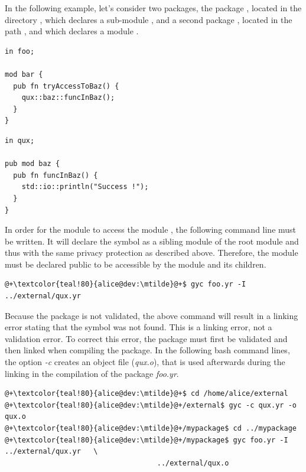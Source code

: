In the following example, let's consider two packages, the package ,
located in the directory , which declares a
sub-module , and a second package , located in the path
, and which declares a module .

\begin{lstlisting}[caption=\textit{/home/alice/mypackage/foo.yr}, style=coloredverbatim]
in foo;

mod bar {
  pub fn tryAccessToBaz() {
    qux::baz::funcInBaz();
  }
}
\end{lstlisting}

\begin{lstlisting}[caption=\textit{/home/alice/external/qux.yr}, style=coloredverbatim]
in qux;

pub mod baz {
  pub fn funcInBaz() {
    std::io::println("Success !");
  }
}
\end{lstlisting}

In order for the module  to access the module
, the following command line must be written. It will declare
the symbol  as a sibling module of the root module  and
thus with the same privacy protection as described above. Therefore, the module
 must be declared public to be accessible by the module
 and its children.

\begin{lstlisting}[style=bashVerb, escapechar=@+]
@+\textcolor{teal!80}{alice@dev:\mtilde}@+$ gyc foo.yr -I ../external/qux.yr
\end{lstlisting}

Because the  package is not validated, the above command will result
in a linking error stating that the symbol  was not
found. This is a linking error, not a validation error. To correct this error,
the  package must first be validated and then linked when compiling
the  package. In the following bash command lines, the option
\textit{-c} creates an object file (\textit{qux.o}), that is used
afterwards during the linking in the compilation of the package \textit{foo.yr}.

\begin{lstlisting}[style=bashVerb, escapechar=@+]
@+\textcolor{teal!80}{alice@dev:\mtilde}@+$ cd /home/alice/external
@+\textcolor{teal!80}{alice@dev:\mtilde}@+/external$ gyc -c qux.yr -o qux.o
@+\textcolor{teal!80}{alice@dev:\mtilde}@+/mypackage$ cd ../mypackage
@+\textcolor{teal!80}{alice@dev:\mtilde}@+/mypackage$ gyc foo.yr -I ../external/qux.yr   \
                                    ../external/qux.o
\end{lstlisting}

